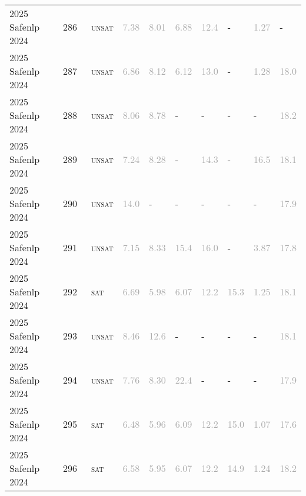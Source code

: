 \begin{center}
{\begin{longtable}{@{}llllllllll@{}}
2025 Safenlp 2024 & 286 & ~\textsc{unsat} & \textcolor{darkgray}{7.38} & \textcolor{darkgray}{8.01} & \textcolor{darkgray}{6.88} & \textcolor{darkgray}{12.4} & - & \textcolor{darkgray}{1.27} & - \\
2025 Safenlp 2024 & 287 & ~\textsc{unsat} & \textcolor{darkgray}{6.86} & \textcolor{darkgray}{8.12} & \textcolor{darkgray}{6.12} & \textcolor{darkgray}{13.0} & - & \textcolor{darkgray}{1.28} & \textcolor{darkgray}{18.0} \\
2025 Safenlp 2024 & 288 & ~\textsc{unsat} & \textcolor{darkgray}{8.06} & \textcolor{darkgray}{8.78} & - & - & - & - & \textcolor{darkgray}{18.2} \\
2025 Safenlp 2024 & 289 & ~\textsc{unsat} & \textcolor{darkgray}{7.24} & \textcolor{darkgray}{8.28} & - & \textcolor{darkgray}{14.3} & - & \textcolor{darkgray}{16.5} & \textcolor{darkgray}{18.1} \\
2025 Safenlp 2024 & 290 & ~\textsc{unsat} & \textcolor{darkgray}{14.0} & - & - & - & - & - & \textcolor{darkgray}{17.9} \\
2025 Safenlp 2024 & 291 & ~\textsc{unsat} & \textcolor{darkgray}{7.15} & \textcolor{darkgray}{8.33} & \textcolor{darkgray}{15.4} & \textcolor{darkgray}{16.0} & - & \textcolor{darkgray}{3.87} & \textcolor{darkgray}{17.8} \\
2025 Safenlp 2024 & 292 & ~\textsc{sat} & \textcolor{darkgray}{6.69} & \textcolor{darkgray}{5.98} & \textcolor{darkgray}{6.07} & \textcolor{darkgray}{12.2} & \textcolor{darkgray}{15.3} & \textcolor{darkgray}{1.25} & \textcolor{darkgray}{18.1} \\
2025 Safenlp 2024 & 293 & ~\textsc{unsat} & \textcolor{darkgray}{8.46} & \textcolor{darkgray}{12.6} & - & - & - & - & \textcolor{darkgray}{18.1} \\
2025 Safenlp 2024 & 294 & ~\textsc{unsat} & \textcolor{darkgray}{7.76} & \textcolor{darkgray}{8.30} & \textcolor{darkgray}{22.4} & - & - & - & \textcolor{darkgray}{17.9} \\
2025 Safenlp 2024 & 295 & ~\textsc{sat} & \textcolor{darkgray}{6.48} & \textcolor{darkgray}{5.96} & \textcolor{darkgray}{6.09} & \textcolor{darkgray}{12.2} & \textcolor{darkgray}{15.0} & \textcolor{darkgray}{1.07} & \textcolor{darkgray}{17.6} \\
2025 Safenlp 2024 & 296 & ~\textsc{sat} & \textcolor{darkgray}{6.58} & \textcolor{darkgray}{5.95} & \textcolor{darkgray}{6.07} & \textcolor{darkgray}{12.2} & \textcolor{darkgray}{14.9} & \textcolor{darkgray}{1.24} & \textcolor{darkgray}{18.2} \\

\end{longtable}}
\end{center}
